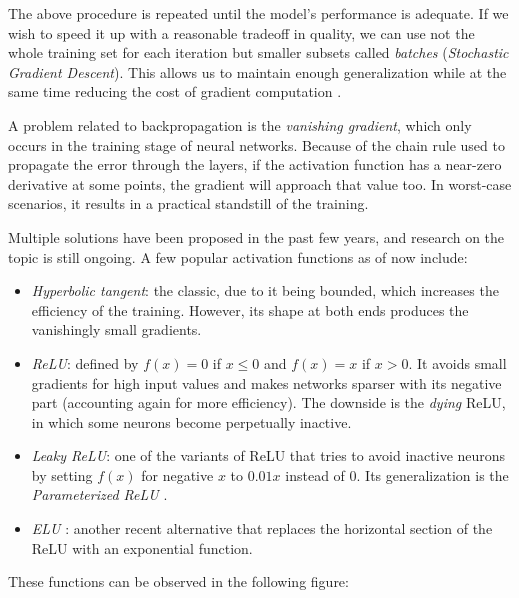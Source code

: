     The above procedure is repeated until the model's performance is adequate. If we wish to speed it up with a reasonable tradeoff in quality, we can use not the whole training set for each iteration but smaller subsets called \textit{batches} (\textit{Stochastic Gradient Descent}). This allows us to maintain enough generalization while at the same time reducing the cost of gradient computation \cite{lecun-dl}.

    A problem related to backpropagation is the \textit{vanishing gradient}, which only occurs in the training stage of neural networks. Because of the chain rule used to propagate the error through the layers, if the activation function has a near-zero derivative at some points, the gradient will approach that value too. In worst-case scenarios, it results in a practical standstill of the training.

    Multiple solutions have been proposed in the past few years, and research on the topic is still ongoing. A few popular activation functions as of now include:

    \begin{itemize}

    	\item
    	\textit{Hyperbolic tangent}: the classic, due to it being bounded, which increases the efficiency of the training. However, its shape at both ends produces the vanishingly small gradients.

    	\item
    	\textit{\ac{ReLU}}: defined by $f(x) = 0$ if $x \leq 0$ and $f(x) = x$ if $x > 0$. It avoids small gradients for high input values and makes networks sparser with its negative part (accounting again for more efficiency). The downside is the \textit{dying} \acs{ReLU}, in which some neurons become perpetually inactive.

    	\item
    	\textit{Leaky \acs{ReLU}}: one of the variants of \acs{ReLU} that tries to avoid inactive neurons by setting $f(x)$ for negative $x$ to $0.01x$ instead of $0$. Its generalization is the \textit{Parameterized ReLU} \cite{delv-deep-relu,deep-res-relu}.

    	\item
    	\textit{\ac{ELU}} \cite{elu}: another recent alternative that replaces the horizontal section of the \acs{ReLU} with an exponential function.

    \end{itemize}

    These functions can be observed in the following figure:

